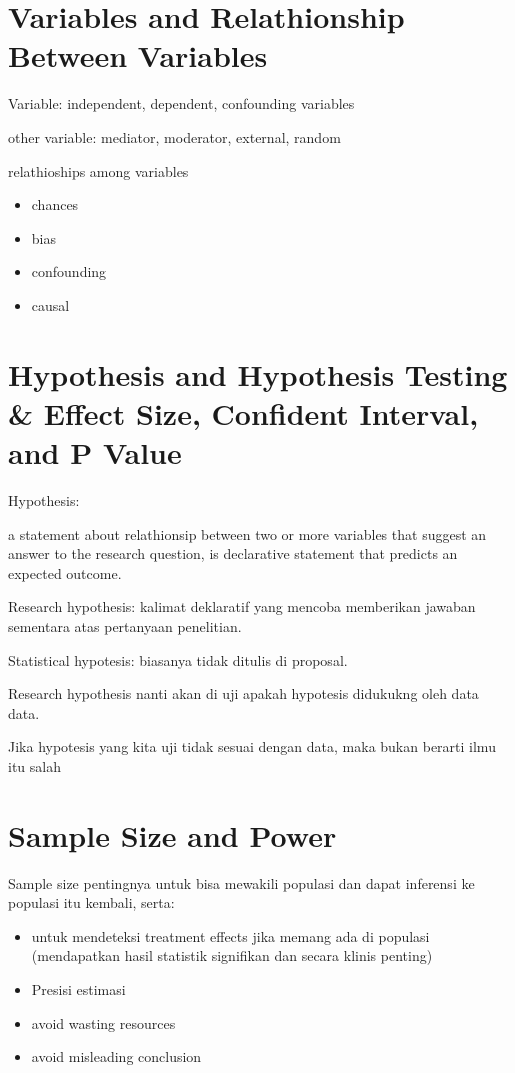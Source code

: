 \documentclass[
  letterpaper,
  DIV=11,
  numbers=noendperiod]{scrreprt}
\providecommand{\tightlist}{%
  \setlength{\itemsep}{0pt}\setlength{\parskip}{0pt}}\usepackage{longtable,booktabs,array}
\begin{document}
\section{Variables and Relathionship Between
Variables}\label{variables-and-relathionship-between-variables}

Variable: independent, dependent, confounding variables

other variable: mediator, moderator, external, random

relathioships among variables

\begin{itemize}
\tightlist
\item
  chances
\item
  bias
\item
  confounding
\item
  causal
\end{itemize}

\section{Hypothesis and Hypothesis Testing \& Effect Size, Confident
Interval, and P
Value}\label{hypothesis-and-hypothesis-testing-effect-size-confident-interval-and-p-value}

Hypothesis:

a statement about relathionsip between two or more variables that
suggest an answer to the research question, is declarative statement
that predicts an expected outcome.

Research hypothesis: kalimat deklaratif yang mencoba memberikan jawaban
sementara atas pertanyaan penelitian.

Statistical hypotesis: biasanya tidak ditulis di proposal.

Research hypothesis nanti akan di uji apakah hypotesis didukukng oleh
data data.

Jika hypotesis yang kita uji tidak sesuai dengan data, maka bukan
berarti ilmu itu salah

\section{Sample Size and Power}\label{sample-size-and-power}

Sample size pentingnya untuk bisa mewakili populasi dan dapat inferensi
ke populasi itu kembali, serta:

\begin{itemize}
\tightlist
\item
  untuk mendeteksi treatment effects jika memang ada di populasi
  (mendapatkan hasil statistik signifikan dan secara klinis penting)
\item
  Presisi estimasi
\item
  avoid wasting resources
\item
  avoid misleading conclusion
\end{itemize}
\end{document}
